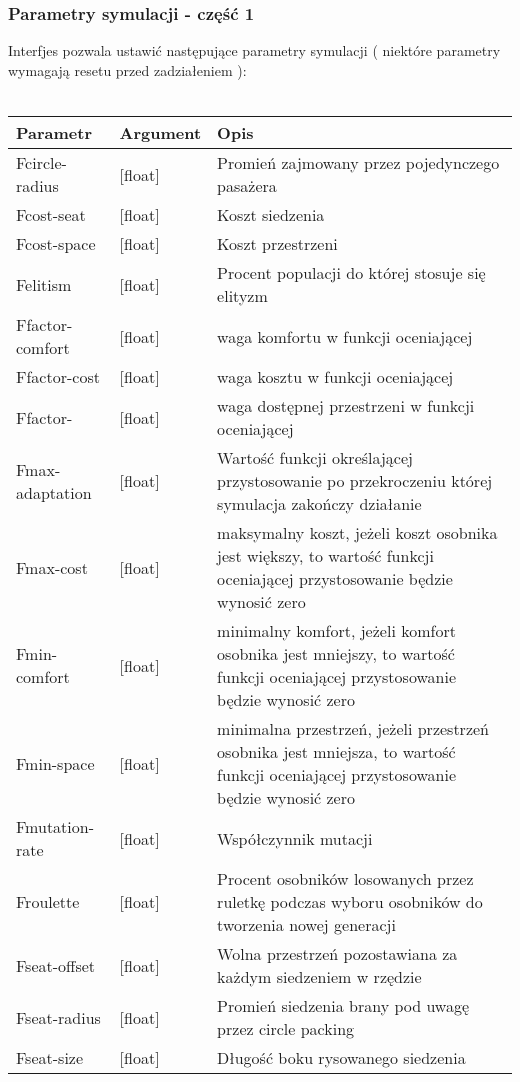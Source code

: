 \documentclass[bibtotocnumbered, headsepline,normalheadings,12pt,polish]{scrreprt}
\begin{document}
\subsubsection{Parametry symulacji - część 1}
Interfjes pozwala ustawić następujące parametry symulacji ( niektóre parametry wymagają resetu przed zadziałeniem ):
\\
\\
\begin{tabular}{| p{2.5cm} | l || p{9cm}|}
\hline
Parametr & Argument & Opis \\
\hline
\hline
Fcircle-radius & [float] & Promień zajmowany przez pojedynczego pasażera\\
\hline
Fcost-seat  & [float] & Koszt siedzenia\\
\hline
Fcost-space & [float] & Koszt przestrzeni\\
\hline
Felitism & [float] & Procent populacji do której stosuje się elityzm\\
\hline
Ffactor-comfort & [float] & waga komfortu w funkcji oceniającej\\
\hline
Ffactor-cost & [float] & waga kosztu w funkcji oceniającej\\
\hline
Ffactor-& [float] & waga dostępnej przestrzeni w funkcji oceniającej\\
\hline
Fmax-adaptation & [float] & Wartość funkcji określającej przystosowanie po przekroczeniu której symulacja zakończy działanie\\
\hline
Fmax-cost & [float] & maksymalny koszt, jeżeli koszt osobnika jest większy, to wartość funkcji oceniającej przystosowanie będzie wynosić zero\\
\hline
Fmin-comfort& [float] & minimalny komfort, jeżeli komfort osobnika jest mniejszy, to wartość funkcji oceniającej przystosowanie będzie wynosić zero\\
\hline
Fmin-space& [float] & minimalna przestrzeń, jeżeli przestrzeń osobnika jest mniejsza, to wartość funkcji oceniającej przystosowanie będzie wynosić zero\\
\hline
Fmutation-rate & [float] & Współczynnik mutacji\\
\hline
Froulette & [float] & Procent osobników losowanych przez ruletkę podczas wyboru osobników do tworzenia nowej generacji\\
\hline
Fseat-offset & [float] & Wolna przestrzeń pozostawiana za każdym siedzeniem w rzędzie\\
\hline
Fseat-radius & [float] & Promień siedzenia brany pod uwagę przez circle packing \\
\hline
Fseat-size & [float] & Długość boku rysowanego siedzenia\\
\hline
\end{tabular}
\\
\end{document}
